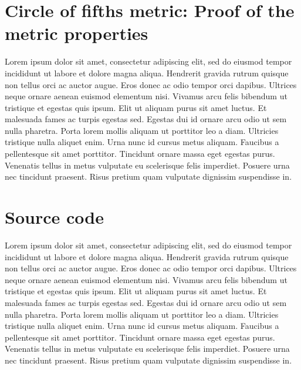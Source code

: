 


\renewcommand{\thesection}{\Alph{section}}


\section{Circle of fifths metric: Proof of the metric properties}
\label{sec:app:cof_metric_proof}

Lorem ipsum dolor sit amet, consectetur adipiscing elit, sed do eiusmod tempor incididunt ut labore et dolore magna aliqua. Hendrerit gravida rutrum quisque non tellus orci ac auctor augue. Eros donec ac odio tempor orci dapibus. Ultrices neque ornare aenean euismod elementum nisi. Vivamus arcu felis bibendum ut tristique et egestas quis ipsum. Elit ut aliquam purus sit amet luctus. Et malesuada fames ac turpis egestas sed. Egestas dui id ornare arcu odio ut sem nulla pharetra. Porta lorem mollis aliquam ut porttitor leo a diam. Ultricies tristique nulla aliquet enim. Urna nunc id cursus metus aliquam. Faucibus a pellentesque sit amet porttitor. Tincidunt ornare massa eget egestas purus. Venenatis tellus in metus vulputate eu scelerisque felis imperdiet. Posuere urna nec tincidunt praesent. Risus pretium quam vulputate dignissim suspendisse in.


\section{Source code}

Lorem ipsum dolor sit amet, consectetur adipiscing elit, sed do eiusmod tempor incididunt ut labore et dolore magna aliqua. Hendrerit gravida rutrum quisque non tellus orci ac auctor augue. Eros donec ac odio tempor orci dapibus. Ultrices neque ornare aenean euismod elementum nisi. Vivamus arcu felis bibendum ut tristique et egestas quis ipsum. Elit ut aliquam purus sit amet luctus. Et malesuada fames ac turpis egestas sed. Egestas dui id ornare arcu odio ut sem nulla pharetra. Porta lorem mollis aliquam ut porttitor leo a diam. Ultricies tristique nulla aliquet enim. Urna nunc id cursus metus aliquam. Faucibus a pellentesque sit amet porttitor. Tincidunt ornare massa eget egestas purus. Venenatis tellus in metus vulputate eu scelerisque felis imperdiet. Posuere urna nec tincidunt praesent. Risus pretium quam vulputate dignissim suspendisse in.
